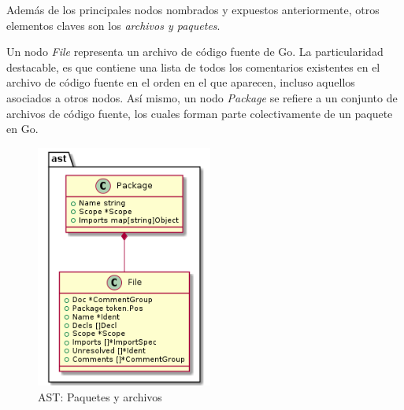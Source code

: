 Además de los principales nodos nombrados y expuestos anteriormente, otros elementos claves
son los \textit{archivos y paquetes}.

Un nodo \textit{File} representa un archivo de código fuente de Go.
La particularidad destacable, es que contiene una lista de todos los comentarios
existentes en el archivo de código fuente en el orden en el que aparecen, incluso aquellos asociados
a otros nodos.
Así mismo, un nodo \textit{Package} se refiere a un conjunto de archivos de código fuente,
los cuales forman parte colectivamente de un paquete en Go.

\begin{figure}[H]
  \includegraphics[height=8cm]{implementation/ast_packages.png}
  \centering
  \caption{AST: Paquetes y archivos}
\end{figure}
